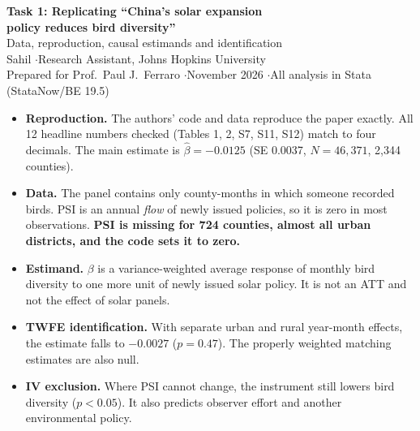 \documentclass[11pt]{article}
\begin{document}
\begin{center}
{\LARGE\bfseries Task 1: Replicating ``China's solar expansion\\[2pt] policy reduces bird diversity''}\\[6pt]
{\large Data, reproduction, causal estimands and identification}\\[8pt]
Sahil \quad$\cdot$\quad Research Assistant, Johns Hopkins University\\
{\small Prepared for Prof.\ Paul J.\ Ferraro \quad$\cdot$\quad November 2026 \quad$\cdot$\quad All analysis in Stata (StataNow/BE 19.5)}
\end{center}

\begin{summarybox}
\small
\begin{itemize}[leftmargin=12pt]
\item \textbf{Reproduction.} The authors' code and data reproduce the paper exactly. All 12 headline numbers checked (Tables 1, 2, S7, S11, S12) match to four decimals. The main estimate is $\hat\beta=-0.0125$ (SE 0.0037, $N=46{,}371$, 2,344 counties).
\item \textbf{Data.} The panel contains only county-months in which someone recorded birds. PSI is an annual \emph{flow} of newly issued policies, so it is zero in most observations. \textbf{PSI is missing for 724 counties, almost all urban districts, and the code sets it to zero.}
\item \textbf{Estimand.} $\beta$ is a variance-weighted average response of monthly bird diversity to one more unit of newly issued solar policy. It is not an ATT and not the effect of solar panels.
\item \textbf{TWFE identification.} With separate urban and rural year-month effects, the estimate falls to $-0.0027$ ($p=0.47$). The properly weighted matching estimates are also null.
\item \textbf{IV exclusion.} Where PSI cannot change, the instrument still lowers bird diversity ($p<0.05$). It also predicts observer effort and another environmental policy.
\end{itemize}
\end{summarybox}

\tableofcontents

\end{document}
